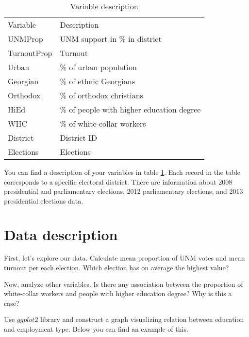 \documentclass{article}\usepackage[]{graphicx}\usepackage[]{color}
\begin{document}
\begin{table}[]
\centering
\caption{Variable description}
\label{lab1}
\begin{tabular}{ll}
Variable    & Description                                          \\
UNMProp     & UNM support in \% in district                            \\
TurnoutProp & Turnout                                         \\
Urban       & \% of urban population                                  \\
Georgian    & \% of ethnic Georgians                                 \\
Orthodox    & \% of orthodox christians                               \\
HiEd        & \% of people with higher education degree                  \\
WHC         & \% of white-collar workers \\
District    & District ID                                                     \\
Elections   & Elections                                                  
\end{tabular}
\end{table}

You can find a description of your variables in table \ref{lab1}. Each record in the table corresponds to a specific electoral district. There are information about 2008 presidential and parliamentary elections, 2012 parliamentary elections, and 2013 presidential elections data.

\section*{Data description}
\paragraph{}

First, let's explore our data. Calculate mean proportion of UNM votes and mean turnout per each election. Which election has on average the highest value?

Now, analyze other variables. Is there any association between the proportion of white-collar workers and people with higher education degree? Why is this a case?

Use $ggplot2$ library and construct a graph visualizing relation between education and employment type. Below you can find an example of this.
\end{document}
